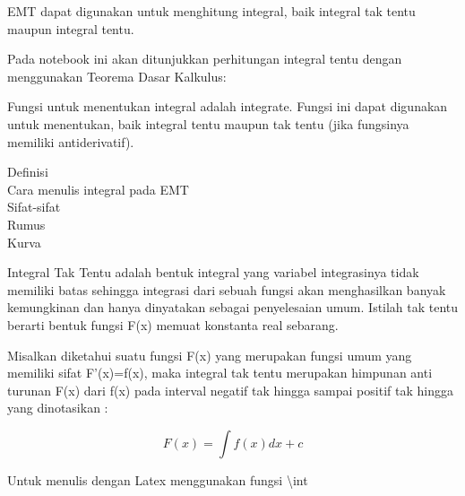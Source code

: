 \documentclass[a4paper,10pt]{article}
\begin{document}
\begin{eulernotebook}
\begin{eulercomment}
\begin{eulercomment}
\begin{eulercomment}
\begin{eulercomment}
\begin{eulercomment}
EMT dapat digunakan untuk menghitung integral, baik integral tak tentu
maupun integral tentu.

Pada notebook ini akan ditunjukkan perhitungan integral tentu dengan
menggunakan Teorema Dasar Kalkulus:


Fungsi untuk menentukan integral adalah integrate. Fungsi ini dapat
digunakan untuk menentukan, baik integral tentu maupun tak tentu (jika
fungsinya memiliki antiderivatif).


\end{eulercomment}
\begin{eulercomment}
Definisi\\
Cara menulis integral pada EMT\\
Sifat-sifat\\
Rumus\\
Kurva

\end{eulercomment}
\begin{eulercomment}
Integral Tak Tentu adalah bentuk integral yang variabel integrasinya
tidak memiliki batas sehingga integrasi dari sebuah fungsi akan
menghasilkan banyak kemungkinan dan hanya dinyatakan sebagai
penyelesaian umum. Istilah tak tentu berarti bentuk fungsi F(x) memuat
konstanta real sebarang.

Misalkan diketahui suatu fungsi F(x) yang merupakan fungsi umum yang
memiliki sifat F'(x)=f(x), maka integral tak tentu merupakan himpunan
anti turunan F(x) dari f(x) pada interval negatif tak hingga sampai
positif tak hingga yang dinotasikan :\\
\end{eulercomment}
\begin{eulerformula}
\[
F(x) = \int f(x) dx+c
\]
\end{eulerformula}
\begin{eulercomment}
\end{eulercomment}
\begin{eulercomment}
Untuk menulis dengan Latex menggunakan fungsi \textbackslash{}int



\end{eulercomment}
\end{eulercomment}
\end{eulercomment}
\end{eulercomment}
\end{eulercomment}
\end{eulernotebook}
\end{document}
